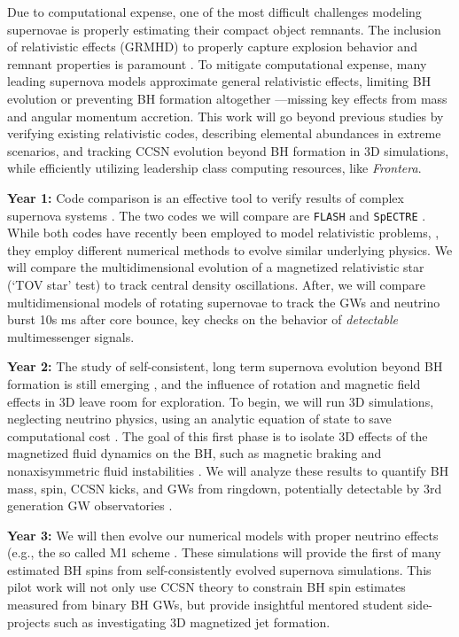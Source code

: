 \documentclass[12pt]{article}
\begin{document}
Due to computational expense, one of the most difficult challenges modeling supernovae is properly estimating their compact object remnants.  The inclusion of relativistic effects (GRMHD) to properly capture explosion behavior and remnant properties is paramount \citep{kuroda:2012}.  To mitigate computational expense, many leading supernova models approximate general relativistic effects, limiting BH evolution \citep{sykes:2022} or preventing BH formation altogether \citep{marek:2006}---missing key effects from mass and angular momentum accretion.  This work will go beyond previous studies by verifying existing relativistic codes, describing elemental abundances in extreme scenarios, and tracking CCSN evolution beyond BH formation in 3D simulations, while efficiently utilizing leadership class computing resources, like \textit{Frontera}.

\textbf{Year 1:} Code comparison is an effective tool to verify results of complex supernova systems \citep{oconnor:2018}.  The two codes we will compare are \texttt{FLASH} \citep{fryxell:2000,dubey:2009} and \texttt{SpECTRE} \citep{deppe:2022}.  While both codes have recently been employed to model relativistic problems, \citep{deppe:2022,pajkos:2022}, they employ different numerical methods to evolve similar underlying physics.  We will compare the multidimensional evolution of a magnetized relativistic star (`TOV star' test) to track central density oscillations.  After, we will compare multidimensional models of rotating supernovae to track the GWs and neutrino burst 10s ms after core bounce, key checks on the behavior of \textit{detectable} multimessenger signals.

\textbf{Year 2:} The study of self-consistent, long term supernova evolution beyond BH formation is still emerging \citep{sykes:2022}, and the influence of rotation and magnetic field effects in 3D leave room for exploration.  To begin, we will run 3D simulations, neglecting neutrino physics, using an analytic equation of state to save computational cost \citep{dimmelmeier:2001}.  The goal of this first phase is to isolate 3D effects of the magnetized fluid dynamics on the BH, such as magnetic braking and nonaxisymmetric fluid instabilities \citep{kuroda:2016}.  We will analyze these results to quantify BH mass, spin, CCSN kicks, and GWs from ringdown, potentially detectable by 3rd generation GW observatories \citep{araujo:2002,crocker:2015}.  

\textbf{Year 3: } We will then evolve our numerical models with proper neutrino effects (e.g., the so called M1 scheme \citep{shibata:2011}.  These simulations will provide the first of many estimated BH spins from self-consistently evolved supernova simulations.  This pilot work will not only use CCSN theory to constrain BH spin estimates measured from binary BH GWs, but provide insightful mentored student side-projects such as investigating 3D magnetized jet formation.
\end{document}
